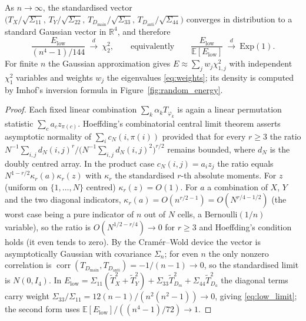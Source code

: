 \begin{corollary}
\label{cor:random_energy_clt}
As $n\to\infty$, the standardised vector
$\big(T_X/\sqrt{\Sigma_{11}},\,T_Y/\sqrt{\Sigma_{22}},\,T_{D_{\mathrm{main}}}/\sqrt{\Sigma_{33}},\,T_{D_{\mathrm{anti}}}/\sqrt{\Sigma_{44}}\big)$
converges in distribution to a standard Gaussian vector in $\mathbb{R}^4$, and therefore
\begin{equation}
\frac{E_{\mathrm{low}}}{(n^4-1)/144}\ \xrightarrow{\ d\ }\ \chi^2_2,
\qquad\text{equivalently}\qquad
\frac{E_{\mathrm{low}}}{\mathbb{E}[E_{\mathrm{low}}]}\ \xrightarrow{\ d\ }\ \mathrm{Exp}(1).
\label{eq:low_limit}
\end{equation}
For finite $n$ the Gaussian approximation gives $E\approx\sum_j w_j\chi^2_{1,j}$ with independent
$\chi^2_1$ variables and weights $w_j$ the eigenvalues \eqref{eq:weights}; its density is computed by
Imhof's inversion formula in Figure~\ref{fig:random_energy}.
\end{corollary}

\begin{proof}
Each fixed linear combination $\sum_k\alpha_kT_{\varphi_k}$ is again a linear permutation
statistic $\sum_c a_c z_{\pi(c)}$. Hoeffding's combinatorial central limit theorem
\cite[Thm.~3]{hoeffding1951} asserts asymptotic normality of
$\sum_i c_N(i,\pi(i))$ provided that for every $r\ge 3$ the ratio
$N^{-1}\sum_{i,j}d_N(i,j)^r\big/\big(N^{-1}\sum_{i,j}d_N(i,j)^2\big)^{r/2}$ remains bounded, where
$d_N$ is the doubly centred array. In the product case $c_N(i,j)=a_iz_j$ the ratio equals
$N^{1-r/2}\kappa_r(a)\kappa_r(z)$ with $\kappa_r$ the standardised $r$-th absolute moments. For $z$
(uniform on $\{1,\dots,N\}$ centred) $\kappa_r(z)=O(1)$. For $a$ a combination of $X$, $Y$ and the
two diagonal indicators, $\kappa_r(a)=O(n^{r/2-1})=O(N^{r/4-1/2})$ (the worst case being a pure
indicator of $n$ out of $N$ cells, a Bernoulli$(1/n)$ variable), so the ratio is
$O(N^{1/2-r/4})\to0$ for $r\ge3$ and Hoeffding's condition holds (it even tends to zero). By the
Cram\'er--Wold device the vector is asymptotically Gaussian with covariance $\Sigma_n$; for even $n$
the only nonzero correlation is $\operatorname{corr}(T_{D_{\mathrm{main}}},T_{D_{\mathrm{anti}}})
=-1/(n-1)\to0$, so the standardised limit is $N(0,I_4)$. In
$E_{\mathrm{low}}=\Sigma_{11}(\tilde T_X^2+\tilde T_Y^2)+\Sigma_{33}\tilde T_{D_m}^2+\Sigma_{44}\tilde T_{D_a}^2$
the diagonal terms carry weight $\Sigma_{33}/\Sigma_{11}=12(n-1)/(n^2(n^2-1))\to0$, giving
\eqref{eq:low_limit}; the second form uses $\mathbb{E}[E_{\mathrm{low}}]/((n^4-1)/72)\to1$.
\end{proof}

